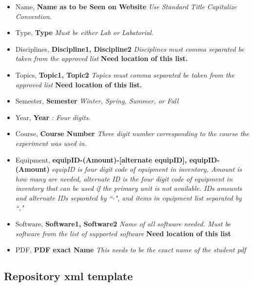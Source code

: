 \documentclass[justified]{book}
\begin{document}
\begin{enumerate}
\begin{itemize}
\item Name, \textbf{Name as to be Seen on Website} \textit{ Use Standard Title Capitalize Convention.}
\item Type, \textbf{Type} \textit{ Must be either Lab or Labatorial.}
\item Disciplines, \textbf{Discipline1, Discipline2} \textit{ Disciplines must comma separated be taken from the approved list} \textbf{Need location of this list.}
\item Topics, \textbf{Topic1, Topic2} \textit{ Topics must comma separated be taken from the approved list} \textbf{Need location of this list.}
\item Semester, \textbf{Semester} \textit{ Winter, Spring, Summer, or Fall}
\item Year, \textbf{Year} \textit{: Four digits.}
\item Course, \textbf{Course Number} \textit{ Three digit number corresponding to the course the experiment was used in.}
\item Equipment, \textbf{equipID-(Amount)-[alternate equipID], equipID-(Amount)} \textit{ equipID is four digit code of equipment in inventory, Amount is how many are needed, alternate ID is the four digit code of equipment in inventory that can be used if the primary unit is not available. IDs amounts and alternate IDs separated by ``-", and items in equipment list separated by ``,"}
\item Software, \textbf{Software1, Software2} \textit{ Name of all software needed. Must be software from the list of supported software} \textbf{Need location of this list}
\item PDF, \textbf{PDF exact Name} \textit{ This needs to be the exact name of the student pdf}
\end{itemize}	

\end{enumerate}

\subsection{Repository xml template}


\end{document}
